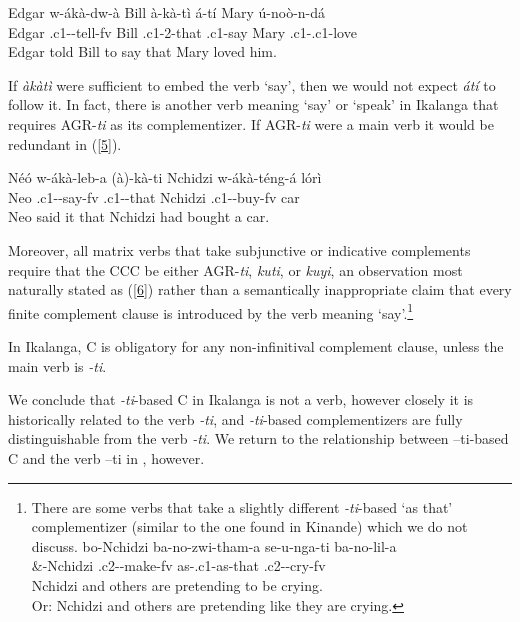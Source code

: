 \documentclass[output=paper,
modfonts
]{langscibook}
\begin{document}
\ea \gll Edgar w-ákà-dw-à  Bill à-kà-tì  á-tí  Mary 	ú-noò-n-dá\\
        Edgar .c1--tell-fv Bill .c1-2-that .c1-say Mary  .c1-.c1-love\\
       \glt Edgar told Bill to say that Mary loved him.
       \z 
       
If \textit{àkàtì} were sufficient to embed the verb `say', then we would not expect \textit{átí} to follow it. In fact, there is another verb meaning `say' or `speak' in Ikalanga that requires AGR-\textit{ti} as its complementizer. If AGR-\textit{ti} were a main verb it would be redundant in (\ref{5}).

\ea\label{5} \gll Néó w-ákà-leb-a    (à)-kà-ti  Nchidzi w-ákà-téng-á  lórì\\
         Neo .c1--say-fv  .c1--that Nchidzi .c1--buy-fv car\\
     \glt  Neo said it that Nchidzi had bought a car.
            \z
            
Moreover, all matrix verbs that take subjunctive or indicative complements require that the CCC be either AGR-\textit{ti}, \textit{kuti}, or \textit{kuyi}, an observation most naturally stated as (\ref{6}) rather than a semantically inappropriate claim that every finite complement clause is introduced by the verb meaning `say'.\footnote{There are some verbs that take a slightly different \textit{-ti}-based `as that' complementizer (similar to the one found in Kinande) which we do not discuss.
\ea \gll bo-Nchidzi  ba-no-zwi-tham-a  se-u-nga-ti	  ba-no-lil-a\\
      \&-Nchidzi   .c2--make-fv  as-.c1-as-that  .c2--cry-fv\\
     \glt Nchidzi and others are pretending to be crying. \\
     Or: Nchidzi and others are pretending like they are crying.\z}  

\ea \label{6}
\textup{In Ikalanga, C is obligatory for any non-infinitival complement clause, unless the 	main verb is} \textit{-ti}.
\z

We conclude that \textit{-ti}-based C in Ikalanga is not a verb, however closely it is historically related to the verb \textit{-ti}, and \textit{-ti}-based complementizers are fully distinguishable from the verb \textit{-ti}. We return to the relationship between –ti-based C and the verb –ti in , however. 
\end{document}
